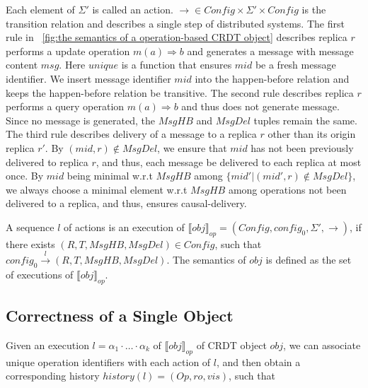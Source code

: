 Each element of $\Sigma'$ is called an action. $\rightarrow \in \mathit{Config} \times \Sigma' \times \mathit{Config}$ is the transition relation and describes a single step of distributed systems. The first rule in \figurename~\ref{fig:the semantics of a operation-based CRDT object} describes replica $r$ performs a update operation $m(a) \Rightarrow b$ and generates a message with message content $\mathit{msg}$. Here $\mathit{unique}$ is a function that ensures $\mathit{mid}$ be a fresh message identifier. We insert message identifier $\mathit{mid}$ into the happen-before relation and keeps the happen-before relation be transitive. The second rule describes replica $r$ performs a query operation $m(a) \Rightarrow b$ and thus does not generate message. Since no message is generated, the $\mathit{MsgHB}$ and $\mathit{MsgDel}$ tuples remain the same. The third rule describes delivery of a message to a replica $r$ other than its origin replica $r'$. By $(\mathit{mid},r) \notin \mathit{MsgDel}$, we ensure that $\mathit{mid}$ has not been previously delivered to replica $r$, and thus, each message be delivered to each replica at most once. By $\mathit{mid}$ being minimal w.r.t $\mathit{MsgHB}$ among $\{ \mathit{mid}' \vert (\mathit{mid}',r) \notin \mathit{MsgDel} \}$, we always choose a minimal element w.r.t $\mathit{MsgHB}$ among operations not been delivered to a replica, and thus, ensures causal-delivery.



A sequence $l$ of actions is an execution of $\llbracket \mathit{obj} \rrbracket_{\mathit{op}} = (\mathit{Config},\mathit{config}_0,\Sigma',\rightarrow)$, if there exists $(R,T,\mathit{MsgHB},\mathit{MsgDel}) \in \mathit{Config}$, such that $\mathit{config}_0 {\xrightarrow{ l }} (R,T,\mathit{MsgHB},\mathit{MsgDel})$. The semantics of $\mathit{obj}$ is defined as the set of executions of $\llbracket \mathit{obj} \rrbracket_{\mathit{op}}$.








\subsection{Correctness of a Single Object}
\label{subsec:correctness of a single object}

Given an execution $l = \alpha_1 \cdot \ldots \cdot \alpha_k$ of $\llbracket \mathit{obj} \rrbracket_{\mathit{op}}$ of CRDT object $\mathit{obj}$, we can associate unique operation identifiers with each action of $l$, and then obtain a corresponding history $\mathit{history}(l) = (\mathit{Op},\mathit{ro},\mathit{vis})$, such that


